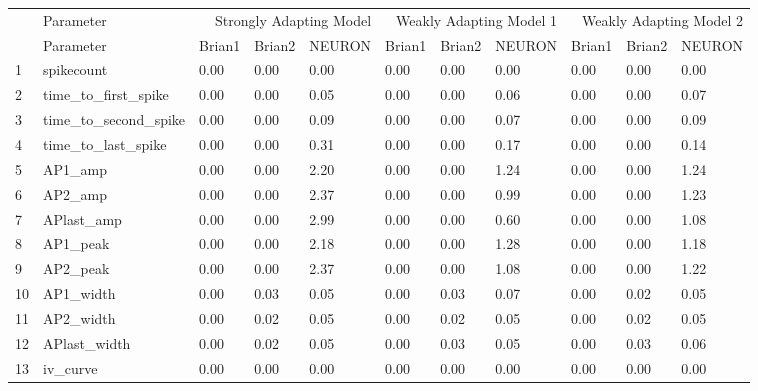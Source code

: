 \begin{tabular}{lllllllllll}
 & Parameter & \multicolumn{3}{r}{Strongly Adapting Model} & \multicolumn{3}{r}{Weakly Adapting Model 1} & \multicolumn{3}{r}{Weakly Adapting Model 2} \\
 & Parameter & Brian1 & Brian2 & NEURON & Brian1 & Brian2 & NEURON & Brian1 & Brian2 & NEURON \\
1 & spikecount & 0.00 & 0.00 & 0.00 & 0.00 & 0.00 & 0.00 & 0.00 & 0.00 & 0.00 \\
2 & time_to_first_spike & 0.00 & 0.00 & 0.05 & 0.00 & 0.00 & 0.06 & 0.00 & 0.00 & 0.07 \\
3 & time_to_second_spike & 0.00 & 0.00 & 0.09 & 0.00 & 0.00 & 0.07 & 0.00 & 0.00 & 0.09 \\
4 & time_to_last_spike & 0.00 & 0.00 & 0.31 & 0.00 & 0.00 & 0.17 & 0.00 & 0.00 & 0.14 \\
5 & AP1_amp & 0.00 & 0.00 & 2.20 & 0.00 & 0.00 & 1.24 & 0.00 & 0.00 & 1.24 \\
6 & AP2_amp & 0.00 & 0.00 & 2.37 & 0.00 & 0.00 & 0.99 & 0.00 & 0.00 & 1.23 \\
7 & APlast_amp & 0.00 & 0.00 & 2.99 & 0.00 & 0.00 & 0.60 & 0.00 & 0.00 & 1.08 \\
8 & AP1_peak & 0.00 & 0.00 & 2.18 & 0.00 & 0.00 & 1.28 & 0.00 & 0.00 & 1.18 \\
9 & AP2_peak & 0.00 & 0.00 & 2.37 & 0.00 & 0.00 & 1.08 & 0.00 & 0.00 & 1.22 \\
10 & AP1_width & 0.00 & 0.03 & 0.05 & 0.00 & 0.03 & 0.07 & 0.00 & 0.02 & 0.05 \\
11 & AP2_width & 0.00 & 0.02 & 0.05 & 0.00 & 0.02 & 0.05 & 0.00 & 0.02 & 0.05 \\
12 & APlast_width & 0.00 & 0.02 & 0.05 & 0.00 & 0.03 & 0.05 & 0.00 & 0.03 & 0.06 \\
13 & iv_curve & 0.00 & 0.00 & 0.00 & 0.00 & 0.00 & 0.00 & 0.00 & 0.00 & 0.00 \\
\end{tabular}
